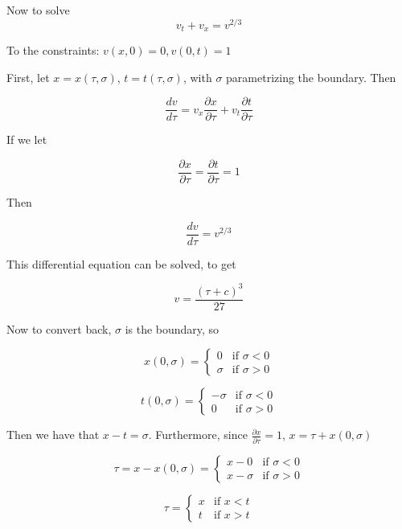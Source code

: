 \documentclass{article}
\begin{document}
Now to solve
$$v_{t} + v_{x} = {v}^{2/3}$$

To the constraints: $v(x, 0) = 0, v(0, t) = 1$

First, let $x = x(\tau, \sigma)$, $t = t(\tau, \sigma)$, with $\sigma$ parametrizing the boundary. Then

$$\frac{dv}{d\tau}= v_{x}\frac{\partial x}{\partial \tau} + v_{t}\frac{\partial t}{\partial \tau}$$

If we let 

$$\frac{\partial x}{\partial \tau} = \frac{\partial t}{\partial \tau} = 1$$

Then 

$$\frac{dv}{d\tau} = v^{2/3}$$

This differential equation can be solved, to get

$$v = \frac{(\tau+c)^3}{27}$$

Now to convert back, $\sigma$ is the boundary, so 

\begin{equation*}
x(0, \sigma) = 
\begin{cases}
0 & \text{if $\sigma < 0$}\\
\sigma & \text{if $\sigma > 0$}
\end{cases}
\end{equation*}

\begin{equation*}
t(0, \sigma) = 
\begin{cases}
-\sigma & \text{if $\sigma < 0$}\\
0 & \text{if $\sigma > 0$}
\end{cases}
\end{equation*}

Then we have that $x - t = \sigma$. Furthermore, since $\frac{\partial x}{\partial \tau} = 1$, $x = \tau + x(0, \sigma)$

\begin{equation*}
\tau = x - x(0, \sigma) = 
\begin{cases}
x -0 & \text{if $\sigma < 0$}\\
x - \sigma & \text{if $\sigma > 0$}
\end{cases}
\end{equation*}

\begin{equation*}
\tau = 
\begin{cases}
x & \text{if $x < t$}\\
t & \text{if $x > t$}
\end{cases}
\end{equation*}
\end{document}
